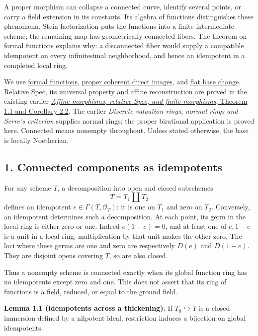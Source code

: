 \documentclass[11pt]{article}
\begin{document}
A proper morphism can collapse a connected curve, identify several
points, or carry a field extension in its constants. Its algebra of
functions distinguishes these phenomena. Stein factorization puts the
functions into a finite intermediate scheme; the remaining map has
geometrically connected fibers. The theorem on formal functions explains
why: a disconnected fiber would supply a compatible idempotent on every
infinitesimal neighborhood, and hence an idempotent in a completed local
ring.

We use \href{the-theorem-on-formal-functions.md}{formal functions},
\href{proper-morphisms-and-coherent-direct-images.md}{proper coherent
direct images}, and
\href{base-change-and-the-grothendieck-complex.md}{flat base change}.
Relative Spec, its universal property and affine reconstruction are
proved in the existing earlier
\href{../AG-MO/AG-MO-05.html}{\emph{Affine morphisms, relative Spec, and
finite morphisms}, Theorem 1.1 and Corollary 2.2}. The earlier
\emph{Discrete valuation rings, normal rings and Serre's criterion}
supplies normal rings; the proper birational application is proved here.
Connected means nonempty throughout. Unless stated otherwise, the base
is locally Noetherian.

\subsection{1. Connected components as
idempotents}\label{connected-components-as-idempotents}

For any scheme \(T\), a decomposition into open and closed subschemes \[
T=T_1\amalg T_2
\] defines an idempotent \(e\in\Gamma(T,\mathcal O_T)\): it is one on
\(T_1\) and zero on \(T_2\). Conversely, an idempotent determines such a
decomposition. At each point, its germ in the local ring is either zero
or one. Indeed \(e(1-e)=0\), and at least one of \(e,1-e\) is a unit in
a local ring; multiplication by that unit makes the other zero. The loci
where these germs are one and zero are respectively \(D(e)\) and
\(D(1-e)\). They are disjoint opens covering \(T\), so are also closed.

Thus a nonempty scheme is connected exactly when its global function
ring has no idempotents except zero and one. This does not assert that
its ring of functions is a field, reduced, or equal to the ground field.

\textbf{Lemma 1.1 (idempotents across a thickening).} If
\(T_0\hookrightarrow T\) is a closed immersion defined by a nilpotent
ideal, restriction induces a bijection on global idempotents.
\end{document}
